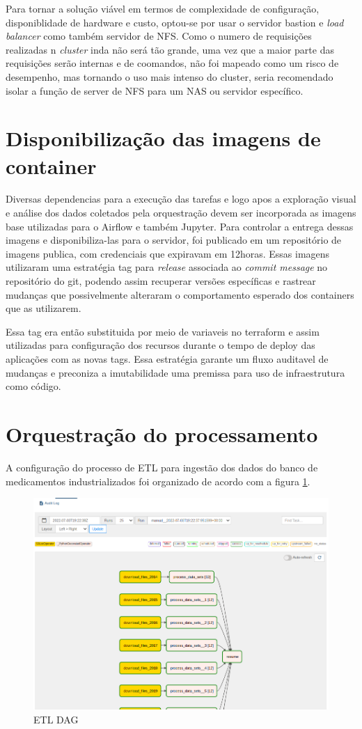 Para tornar a solução viável em termos de complexidade de configuração, disponiblidade de hardware e custo, optou-se por usar o servidor bastion e \emph{load balancer} como também servidor de NFS. Como o numero de requisições realizadas n \emph{cluster} inda não será tão grande, uma vez que a maior parte das requisições serão internas e de coomandos, não foi mapeado como um risco de desempenho, mas tornando o uso mais intenso do cluster, seria recomendado isolar a função de server de NFS para um NAS ou servidor específico.

\section{Disponibilização das imagens de container}

Diversas dependencias para a execução das tarefas e logo apos a exploração visual e análise dos dados coletados pela orquestração devem ser incorporada as imagens base utilizadas para o Airflow e também Jupyter. Para controlar a entrega dessas imagens e disponibiliza-las para o servidor, foi publicado em um repositório de imagens publica, com credenciais que expiravam em 12horas. Essas imagens utilizaram uma estratégia tag para \emph{release} associada ao \emph{commit message} no repositório do git, podendo assim recuperar versões específicas e rastrear mudanças que possivelmente alteraram o comportamento esperado dos containers que as utilizarem. 

Essa tag era então substituida por meio de variaveis no terraform e assim utilizadas para configuração dos recursos durante o tempo de deploy das aplicações com as novas tags. Essa estratégia garante um fluxo auditavel de mudanças e preconiza a imutabilidade uma premissa para uso de infraestrutura como código. 

\section{Orquestração do processamento}
A configuração do processo de ETL para ingestão dos dados do banco de medicamentos industrializados foi organizado de acordo com a figura \ref{fig:airflowdag}.
\begin{figure}[!ht]
    \centering
    \includegraphics[width=0.8\linewidth]{04-figuras/graph_execution.png}
    \caption{ETL DAG}
    \label{fig:airflowdag}
\end{figure}

